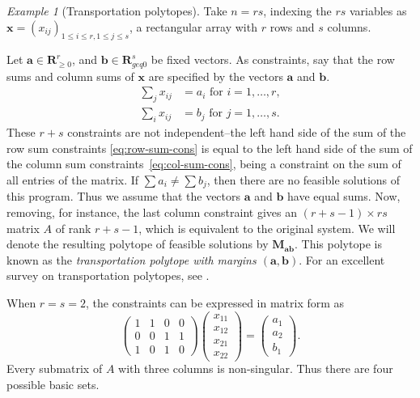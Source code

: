 \documentclass{amsbook}
\newcommand{\xx}{\mathbf x}
\newcommand{\bb}{\mathbf b}
\renewcommand{\aa}{\mathbf a}
\newcommand{\RR}{\mathbf R}
\newcommand{\MM}{\mathbf M}
\theoremstyle{definition}
\theoremstyle{remark}
\newtheorem{example}[theorem]{Example}
\begin{document}
\begin{example}[Transportation polytopes]
  \label{example:transportation}
  Take $n=rs$, indexing the $rs$ variables as $\xx=(x_{ij})_{1\leq i\leq r,1\leq j\leq s}$, a rectangular array with $r$ rows and $s$ columns.

  Let $\aa\in \RR_{\geq 0}^r$, and $\bb\in \RR_{geq 0}^s$ be fixed vectors.
  As constraints, say that the row sums and column sums of $\xx$ are specified by the vectors $\aa$ and $\bb$.
  \begin{align}
    \tag{R}
    \label{eq:row-sum-cons}
    \sum_j x_{ij} &= a_i \text{ for } i=1,\dotsc,r,\\
    \tag{C}
    \label{eq:col-sum-cons}
    \sum_i x_{ij} &= b_j \text{ for } j=1,\dotsc,s.
  \end{align}
  These $r+s$ constraints are not independent--the left hand side of the sum of the row sum constraints \eqref{eq:row-sum-cons} is equal to the left hand side of the sum of the column sum constraints~\eqref{eq:col-sum-cons}, being a constraint on the sum of all entries of the matrix.
  If $\sum a_i\neq \sum b_j$, then there are no feasible solutions of this program.
  Thus we assume that the vectors $\aa$ and $\bb$ have equal sums.
  Now, removing, for instance, the last column constraint gives an $(r+s-1)\times rs$ matrix $A$ of rank $r+s-1$, which is equivalent to the original system.
  We will denote the resulting polytope of feasible solutions by $\MM_{\aa\bb}$.
  This polytope is known as the \emph{transportation polytope with margins $(\aa,\bb)$}.
  For an excellent survey on transportation polytopes, see \cite{DLK2014}.

  When $r=s=2$, the constraints can be expressed in matrix form as
  \begin{equation}
    \label{eq:birkhoff2}
    \begin{pmatrix}
      1 & 1 & 0 & 0\\
      0 & 0 & 1 & 1\\
      1 & 0 & 1 & 0
    \end{pmatrix}
    \begin{pmatrix}
      x_{11}\\x_{12}\\x_{21}\\x_{22}
    \end{pmatrix}
    =
    \begin{pmatrix}
     a_1\\a_2\\b_1
    \end{pmatrix}.
  \end{equation}
  Every submatrix of $A$ with three columns is non-singular.
  Thus there are four possible basic sets.
\end{example}
\end{document}
